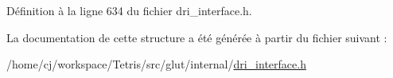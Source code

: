 Définition à la ligne 634 du fichier dri\-\_\-interface.\-h.



La documentation de cette structure a été générée à partir du fichier suivant \-:\begin{DoxyCompactItemize}
\item 
/home/cj/workspace/\-Tetris/src/glut/internal/\hyperlink{dri__interface_8h}{dri\-\_\-interface.\-h}\end{DoxyCompactItemize}
